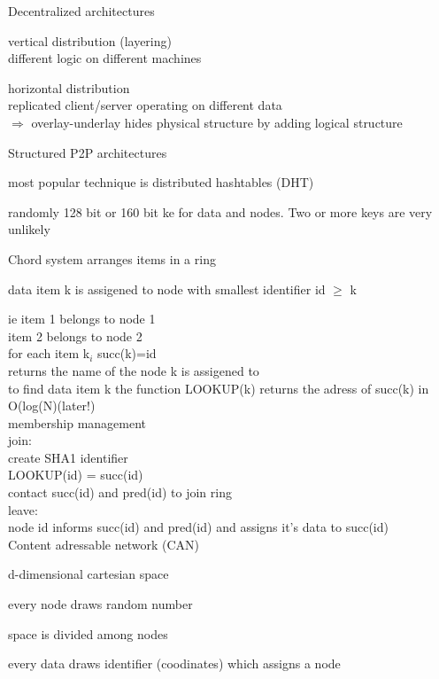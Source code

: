 \documentclass[ngerman,a4paper]{report}
\begin{document}
\begin{compactenum}
\begin{compactitem}
\end{compactitem}
\item Decentralized architectures\\
\begin{compactitem}
\item vertical distribution (layering)\\
different logic on different machines
\item horizontal distribution \\
replicated client/server operating on different data\\
$\Rightarrow$ overlay-underlay hides physical structure by adding logical structure\\
\end{compactitem}

Structured P2P architectures\\
\begin{compactitem}
\item most popular technique is distributed hashtables (DHT)\\
\item randomly 128 bit or 160 bit ke for data and nodes. Two or more keys are very unlikely\\
\item Chord system arranges items in a ring
\item data item k is assigened to node with smallest identifier id $\geq$ k
\end{compactitem}
ie item 1 belongs to node 1\\
item 2 belongs to node 2\\
for each item k$_i$ succ(k)=id\\
returns  the name of the node k is assigened to\\
to find data item k the function LOOKUP(k) returns the adress of succ(k) in O(log(N)(later!)\\

membership management\\
join:\\
create SHA1 identifier\\
LOOKUP(id) = succ(id)\\
contact succ(id) and pred(id) to join ring\\

leave:\\
node id informs succ(id) and pred(id) and assigns it's data to succ(id)\\

Content adressable network (CAN)\\
\begin{compactitem}
\item d-dimensional cartesian space
\item every node draws random number
\item space is divided among nodes
\item every data draws identifier (coodinates) which assigns a node


\end{compactitem}
\end{compactenum}
\end{document}
